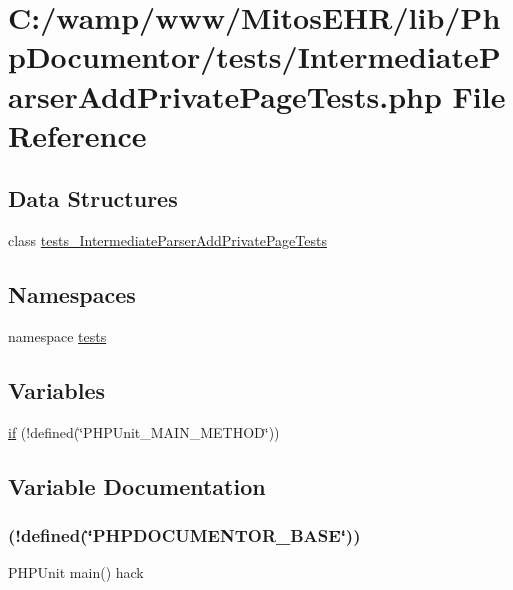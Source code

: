 \hypertarget{_intermediate_parser_add_private_page_tests_8php}{\section{\-C\-:/wamp/www/\-Mitos\-E\-H\-R/lib/\-Php\-Documentor/tests/\-Intermediate\-Parser\-Add\-Private\-Page\-Tests.php \-File \-Reference}
\label{_intermediate_parser_add_private_page_tests_8php}
}
\subsection*{\-Data \-Structures}
\begin{DoxyCompactItemize}
\item 
class \hyperlink{classtests___intermediate_parser_add_private_page_tests}{tests\-\_\-\-Intermediate\-Parser\-Add\-Private\-Page\-Tests}
\end{DoxyCompactItemize}
\subsection*{\-Namespaces}
\begin{DoxyCompactItemize}
\item 
namespace \hyperlink{namespacetests}{tests}
\end{DoxyCompactItemize}
\subsection*{\-Variables}
\begin{DoxyCompactItemize}
\item 
\hyperlink{_intermediate_parser_add_private_page_tests_8php_ae3cacee49c3c7d622bb92397daeb7733}{if} (!defined(\char`\"{}\-P\-H\-P\-Unit\-\_\-\-M\-A\-I\-N\-\_\-\-M\-E\-T\-H\-O\-D\char`\"{}))
\end{DoxyCompactItemize}


\subsection{\-Variable \-Documentation}
\hypertarget{_intermediate_parser_add_private_page_tests_8php_ae3cacee49c3c7d622bb92397daeb7733}{
\subsubsection[{if}]{(!defined(\char`\"{}\-P\-H\-P\-D\-O\-C\-U\-M\-E\-N\-T\-O\-R\-\_\-\-B\-A\-S\-E\char`\"{}))}}\label{_intermediate_parser_add_private_page_tests_8php_ae3cacee49c3c7d622bb92397daeb7733}
\-P\-H\-P\-Unit main() hack

